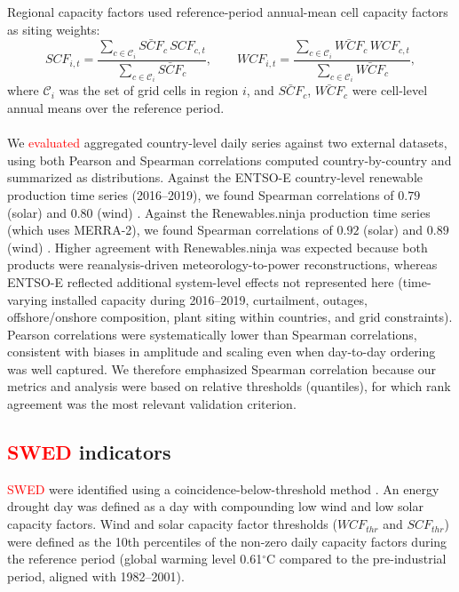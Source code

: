 \documentclass[pdflatex,sn-mathphys-num]{sn-jnl}%
\begin{document}
Regional capacity factors used reference-period annual-mean cell capacity factors as siting weights:
\begin{equation}
    SCF_{i,t}=\frac{\sum_{c\in\mathcal{C}_i} \bar{SCF}_c\,SCF_{c,t}}{\sum_{c\in\mathcal{C}_i}\bar{SCF}_c},\qquad
    WCF_{i,t}=\frac{\sum_{c\in\mathcal{C}_i} \bar{WCF}_c\,WCF_{c,t}}{\sum_{c\in\mathcal{C}_i}\bar{WCF}_c},
\end{equation}
where $\mathcal{C}_i$ was the set of grid cells in region $i$, and $\bar{SCF}_c$, $\bar{WCF}_c$ were cell-level annual means over the reference period.\\
\\
We \textcolor{red}{evaluated} aggregated country-level daily series against two external datasets, using both Pearson and Spearman correlations computed country-by-country and summarized as distributions. Against the ENTSO-E country-level renewable production time series (2016--2019), we found Spearman correlations of $0.79$ (solar) and $0.80$ (wind) \cite{entsoe_powerstats}. Against the Renewables.ninja production time series (which uses MERRA-2), we found Spearman correlations of $0.92$ (solar) and $0.89$ (wind) \cite{pfenningerLongtermPatternsEuropean2016}. Higher agreement with Renewables.ninja was expected because both products were reanalysis-driven meteorology-to-power reconstructions, whereas ENTSO-E reflected additional system-level effects not represented here (time-varying installed capacity during 2016--2019, curtailment, outages, offshore/onshore composition, plant siting within countries, and grid constraints). Pearson correlations were systematically lower than Spearman correlations, consistent with biases in amplitude and scaling even when day-to-day ordering was well captured. We therefore emphasized Spearman correlation because our metrics and analysis were based on relative thresholds (quantiles), for which rank agreement was the most relevant validation criterion.


\subsection{\textcolor{red}{SWED} indicators}\label{sec:method_REDind}
\textcolor{red}{SWED} were identified using a coincidence-below-threshold method \cite{wilczakWindSolarEnergy2025, oteroCopulabasedAssessmentRenewable2022, Bracken2024}.
An energy drought day was defined as a day with compounding low wind and low solar capacity factors. Wind and solar capacity factor thresholds ($WCF_{thr}$ and $SCF_{thr}$) were defined as the 10th percentiles of the non-zero daily capacity factors during the reference period (global warming level 0.61$^{\circ}$C compared to the pre-industrial period, aligned with 1982–2001).
\end{document}
